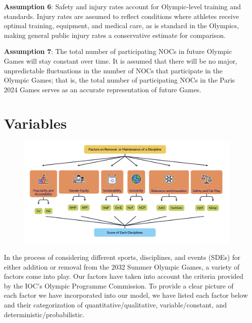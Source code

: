 \documentclass[12pt]{article}
\begin{document}
\textbf{Assumption 6}: Safety and injury rates account for Olympic-level training and standards.  Injury rates are assumed to reflect conditions where athletes receive optimal training, equipment, and medical care, as is standard in the Olympics, making general public injury rates a conservative estimate for comparison.
 

 
\textbf{Assumption 7}: The total number of participating NOCs in future Olympic Games will stay constant over time. It is assumed that there will be no major, unpredictable fluctuations in the number of NOCs that participate in the Olympic Games; that is, the total number of participating NOCs in the Paris 2024 Games serves as an accurate representation of future Games.

\section{Variables}



    \begin{figure}[H]
    \centering
    \includegraphics[width=1\textwidth]{Factor.png}
    \caption{\label{fig:Factor} }
    
\end{figure}
In the process of considering different sports, disciplines, and events (SDEs) for either addition or removal from the 2032 Summer Olympic Games, a variety of factors come into play. Our factors have taken into account the criteria provided by the IOC’s Olympic Programme Commission. To provide a clear picture of each factor we have incorporated into our model, we have listed each factor below and their categorization of quantitative/qualitative, variable/constant, and deterministic/probabilistic.
\end{document}
